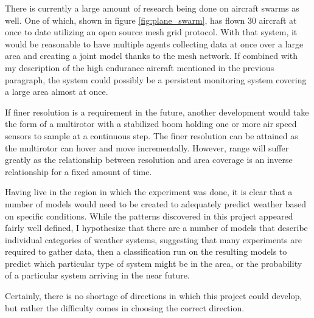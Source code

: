 \documentclass[12pt]{report}
\begin{document}
There is currently a large amount of research being done on aircraft swarms as well. One of which, shown in figure \ref{fig:plane_swarm}, has flown 30 aircraft at once to date utilizing an open source mesh grid protocol. With that system, it would be reasonable to have multiple agents collecting data at once over a large area and creating a joint model thanks to the mesh network. If combined with my description of the high endurance aircraft mentioned in the previous paragraph, the system could possibly be a persistent monitoring system covering a large area almost at once.

If finer resolution is a requirement in the future, another development would take the form of a multirotor with a stabilized boom holding one or more air speed sensors to sample at a continuous step. The finer resolution can be attained as the multirotor can hover and move incrementally. However, range will suffer greatly as the relationship between resolution and area coverage is an inverse relationship for a fixed amount of time.

Having live in the region in which the experiment was done, it is clear that a number of models would need to be created to adequately predict weather based on specific conditions. While the patterns discovered in this project appeared fairly well defined, I hypothesize that there are a number of models that describe individual categories of weather systems, suggesting that many experiments are required to gather data, then a classification run on the resulting models to predict which particular type of system might be in the area, or the probability of a particular system arriving in the near future. 

Certainly, there is no shortage of directions in which this project could develop, but rather the difficulty comes in choosing the correct direction.
\end{document}
